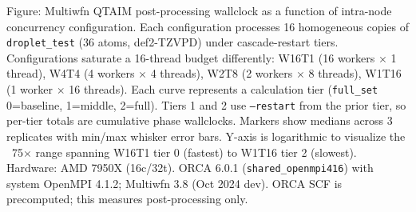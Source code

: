 Figure: Multiwfn QTAIM post-processing wallclock as a function of intra-node concurrency configuration. Each configuration processes 16 homogeneous copies of \texttt{droplet\_test} (36 atoms, def2-TZVPD) under cascade-restart tiers. Configurations saturate a 16-thread budget differently: W16T1 (16 workers $\times$ 1 thread), W4T4 (4 workers $\times$ 4 threads), W2T8 (2 workers $\times$ 8 threads), W1T16 (1 worker $\times$ 16 threads). Each curve represents a calculation tier (\texttt{full\_set} 0=baseline, 1=middle, 2=full). Tiers 1 and 2 use \texttt{--restart} from the prior tier, so per-tier totals are cumulative phase wallclocks. Markers show medians across 3 replicates with min/max whisker error bars. Y-axis is logarithmic to visualize the ~75$\times$ range spanning W16T1 tier 0 (fastest) to W1T16 tier 2 (slowest). Hardware: AMD 7950X (16c/32t). ORCA 6.0.1 (\texttt{shared\_openmpi416}) with system OpenMPI 4.1.2; Multiwfn 3.8 (Oct 2024 dev). ORCA SCF is precomputed; this measures post-processing only.

